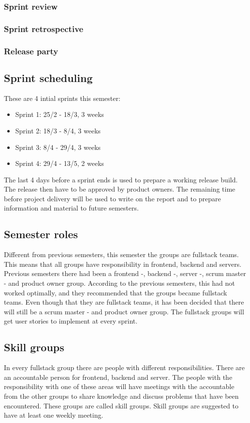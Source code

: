\subsubsection{Sprint review}
\subsubsection{Sprint retrospective}
\subsubsection{Release party}

\subsection{Sprint scheduling}
These are 4 intial sprints this semester:
\begin{itemize}
    \item Sprint 1: 25/2 - 18/3, 3 weeks
    \item Sprint 2: 18/3 - 8/4, 3 weeks
    \item Sprint 3: 8/4 - 29/4, 3 weeks
    \item Sprint 4: 29/4 - 13/5, 2 weeks
\end{itemize}
\noindent
The last 4 days before a sprint ends is used to prepare a working release build. 
The release then have to be approved by product owners.
The remaining time before project delivery will be used to write on the report and to prepare information and material to future semesters. 

\subsection{Semester roles}
Different from previous semesters, this semester the groups are fullstack teams. 
This means that all groups have responsibility in frontend, backend and servers.
Previous semesters there had been a frontend -, backend -, server -, scrum master - and product owner group. 
According to the previous semesters, this had not worked optimally, and they recommended that the groups became fullstack teams.
Even though that they are fullstack teams, it has been decided that there will still be a scrum master - and product owner group. 
The fullstack groups will get user stories to implement at every sprint.

\subsection{Skill groups}
In every fullstack group there are people with different responsibilities.
There are an accountable person for frontend, backend and server.
The people with the responsibility with one of these areas will have meetings with the accountable from the other groups to share knowledge and discuss problems that have been encountered.
These groups are called skill groups.
Skill groups are suggested to have at least one weekly meeting.

